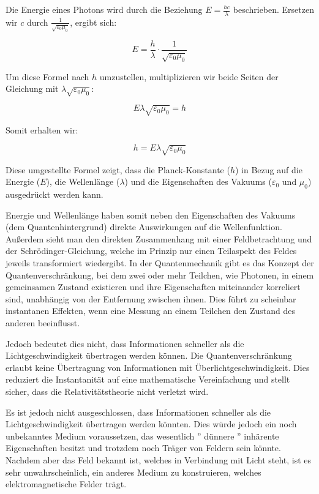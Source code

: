 \documentclass[12pt,a4paper]{article}
\begin{document}
	Die Energie eines Photons wird durch die Beziehung $E = \frac{hc}{\lambda}$ beschrieben. Ersetzen wir $c$ durch $\frac{1}{\sqrt{\varepsilon_0 \mu_0}}$, ergibt sich:
	
	\[
	E = \frac{h}{\lambda} \cdot \frac{1}{\sqrt{\varepsilon_0 \mu_0}}
	\]
	
	Um diese Formel nach $h$ umzustellen, multiplizieren wir beide Seiten der Gleichung mit $\lambda \sqrt{\varepsilon_0 \mu_0}$:
	
	\[
	E \lambda \sqrt{\varepsilon_0 \mu_0} = h
	\]
	
	Somit erhalten wir:
	
	\[
	h = E \lambda \sqrt{\varepsilon_0 \mu_0}
	\]
	
	Diese umgestellte Formel zeigt, dass die Planck-Konstante ($h$) in Bezug auf die Energie ($E$), die Wellenlänge ($\lambda$) und die Eigenschaften des Vakuums ($\varepsilon_0$ und $\mu_0$) ausgedrückt werden kann.
	
	Energie und Wellenlänge haben somit neben den Eigenschaften des Vakuums (dem Quantenhintergrund) direkte Auswirkungen auf die Wellenfunktion. Außerdem sieht man den direkten Zusammenhang mit einer Feldbetrachtung und der Schrödinger-Gleichung, welche im Prinzip nur einen Teilaspekt des Feldes jeweils transformiert wiedergibt.
	In der Quantenmechanik gibt es das Konzept der Quantenverschränkung, bei dem zwei oder mehr Teilchen, wie Photonen, in einem gemeinsamen Zustand existieren und ihre Eigenschaften miteinander korreliert sind, unabhängig von der Entfernung zwischen ihnen. Dies führt zu scheinbar instantanen Effekten, wenn eine Messung an einem Teilchen den Zustand des anderen beeinflusst.
	
	Jedoch bedeutet dies nicht, dass Informationen schneller als die Lichtgeschwindigkeit übertragen werden können. Die Quantenverschränkung erlaubt keine Übertragung von Informationen mit Überlichtgeschwindigkeit. Dies reduziert die Instantanität auf eine mathematische Vereinfachung und stellt sicher, dass die Relativitätstheorie nicht verletzt wird.
	
	Es ist jedoch nicht ausgeschlossen, dass Informationen schneller als die Lichtgeschwindigkeit übertragen werden könnten. Dies würde jedoch ein noch unbekanntes Medium voraussetzen, das wesentlich '' dünnere '' inhärente Eigenschaften besitzt und trotzdem noch Träger von Feldern sein könnte. Nachdem aber das Feld bekannt ist, welches in Verbindung mit Licht steht, ist es sehr unwahrscheinlich, ein anderes Medium zu konstruieren, welches elektromagnetische Felder trägt.
	
\end{document}
